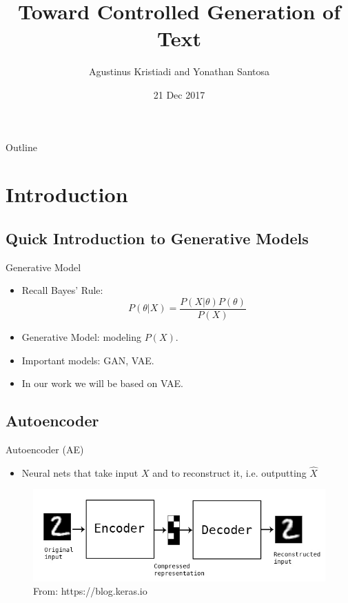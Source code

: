 \documentclass{beamer}
\title[Toward Controlled Generation of Text]{Toward Controlled Generation of Text}
\author{Agustinus Kristiadi and Yonathan Santosa}
\institute{University of Bonn}
\date{21 Dec 2017}
\begin{document}
    \begin{frame}
      \titlepage
    \end{frame}

    \begin{frame}{Outline}
     \tableofcontents
    \end{frame}


    \section{Introduction}

    \subsection{Quick Introduction to Generative Models}

    \begin{frame}{Generative Model}

    \begin{itemize}
        \item Recall Bayes' Rule:
        $$P(\theta \vert X) = \frac{P(X \vert \theta) P(\theta)}{P(X)}$$
        \item Generative Model: modeling $P(X)$.
        \item Important models: GAN, VAE.
        \item In our work we will be based on VAE.
    \end{itemize}

    \end{frame}

    \subsection{Autoencoder}

    \begin{frame}{Autoencoder (AE)}

      \begin{itemize}
          \item Neural nets that take input $X$ and to reconstruct it, i.e. outputting $\hat{X}$

      \end{itemize}

      \begin{figure}
        \includegraphics[width=\textwidth]{ae}
        \caption{\label{fig:ae}From: https://blog.keras.io}
        \end{figure}

    \end{frame}
\end{document}

